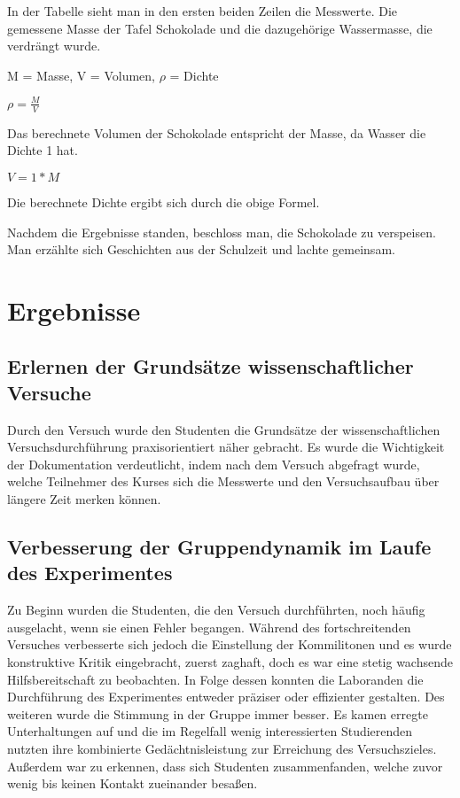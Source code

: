 \documentclass[12pt]{scrartcl}
\begin{document}
In der Tabelle sieht man in den ersten beiden Zeilen die Messwerte. Die gemessene Masse der Tafel Schokolade und die dazugehörige Wassermasse, die verdrängt wurde.

\noindent M = Masse, V = Volumen, $\rho$ = Dichte 

\noindent $\rho =  \frac{M}{V}$

\noindent  Das berechnete Volumen der Schokolade entspricht der Masse, da Wasser die Dichte 1 hat.

\noindent $V =  1 * M$

\noindent Die berechnete Dichte ergibt sich durch die obige Formel. 

\noindent Nachdem die Ergebnisse standen, beschloss man, die Schokolade zu verspeisen. Man erzählte sich Geschichten aus der Schulzeit und lachte gemeinsam.

\section{Ergebnisse}
\subsection{Erlernen der Grundsätze wissenschaftlicher Versuche}
Durch den Versuch wurde den Studenten die Grundsätze der wissenschaftlichen Versuchsdurchführung praxisorientiert näher gebracht. Es wurde die Wichtigkeit der Dokumentation verdeutlicht, indem nach dem Versuch abgefragt wurde, welche Teilnehmer des Kurses sich die Messwerte und den Versuchsaufbau über längere Zeit merken können.
\subsection{Verbesserung der Gruppendynamik im Laufe des Experimentes}
Zu Beginn wurden die Studenten, die den Versuch durchführten, noch häufig ausgelacht, wenn sie einen Fehler begangen. Während des fortschreitenden Versuches verbesserte sich jedoch die Einstellung der Kommilitonen und es wurde konstruktive Kritik eingebracht, zuerst zaghaft, doch es war eine stetig wachsende Hilfsbereitschaft zu beobachten. In Folge dessen konnten die Laboranden die Durchführung des Experimentes entweder präziser oder effizienter gestalten. Des weiteren wurde die Stimmung in der Gruppe immer besser. Es kamen erregte Unterhaltungen auf und die im Regelfall wenig interessierten Studierenden nutzten ihre kombinierte Gedächtnisleistung zur Erreichung des Versuchszieles. Außerdem war zu erkennen, dass sich Studenten zusammenfanden, welche zuvor wenig bis keinen Kontakt zueinander besaßen.
\end{document}
